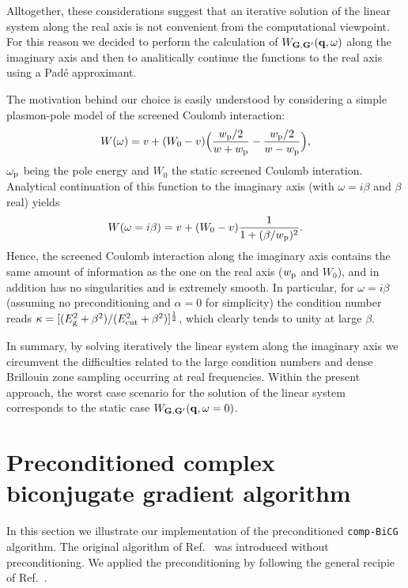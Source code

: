 \documentclass[twocolumn,prb,showpacs,superscriptaddress]{revtex4}
\def\w{\omega}
\def\q{{\bf q}}
\def\G{{\bf G}}
\def\Gp{{\bf G^\prime}}
\begin{document}
Alltogether, these considerations suggest that an iterative solution of the
linear system along the real axis is not convenient from the computational
viewpoint. For this reason we decided to perform the calculation of $W_{\G,\Gp}(\q,\w)$
along the imaginary axis and then to analitically continue the functions
to the real axis using a Pad\'e approximant.\cite{pade1,pade2,pade3}

The motivation behind our choice is easily understood by considering a simple
plasmon-pole model of the screened Coulomb interaction:\cite{hl86}
  \begin{equation}
  W(\w) = v + (W_0 -v) \Big( \frac{w_{\rm p}/2}{w+w_{\rm p}} - \frac{w_{\rm p}/2}{w-w_{\rm p}} \Big),
  \end{equation}
$\w_{\rm p}$ being the pole energy and $W_0$ the static screened Coulomb interation.
Analytical continuation of this function to the imaginary axis (with $\w=i\beta$ and $\beta$ real)
yields
  \begin{equation} \label{eq.pp.im}
  W(\w=i\beta) = v + (W_0 -v) \frac{1}{1+(\beta/w_{\rm p})^2}.
  \end{equation}
Hence, the screened Coulomb interaction along the imaginary axis contains the same
amount of information as the one on the real axis ($w_{\rm p}$ and $W_0$), and 
in addition has no singularities and is extremely smooth.
In particular, for $\w=i\beta$ (assuming no preconditioning
and $\alpha=0$ for simplicity) the condition number reads 
$\kappa=[(E_{\rm g}^2+\beta^2)/(E_{\rm cut}^2+\beta^2)]^\frac{1}{2}$,
which clearly tends to unity at large $\beta$.

In summary, by solving iteratively the linear system along the imaginary
axis we circumvent the difficulties related to the large condition numbers and 
dense Brillouin zone sampling occurring at real frequencies. Within the present
approach, the worst case scenario for the solution of the linear system 
corresponds to the static case $W_{\G,\Gp}(\q,\w=0)$.

\section{Preconditioned complex biconjugate gradient algorithm}

In this section we illustrate our implementation of the preconditioned 
{\tt comp-BiCG} algorithm. The original algorithm of Ref.\ 
was introduced without preconditioning. We applied the preconditioning
by following the general recipie of Ref.\ .
\end{document}
